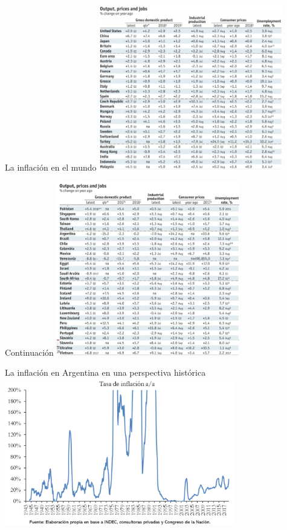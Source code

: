 \documentclass{beamer}
\begin{document}
\begin{frame}{La inflación en el mundo}
    \centering\includegraphics[width=8cm]{../P70.png}\
\end{frame}


\begin{frame}{Continuación}
    \centering\includegraphics[width=8cm]{../P71.png}\
\end{frame}

\begin{frame}{La inflación en Argentina en una perspectiva histórica}
\centering\includegraphics[width=10cm]{../Figures/P59.png}\
\end{frame}
\end{document}
